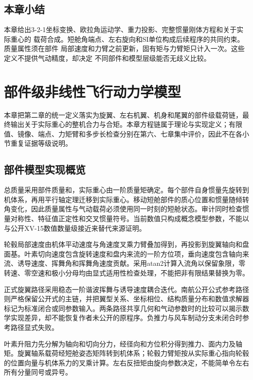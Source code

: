 \documentclass[UTF8,12pt,oneside,openany,fontset=windows]{ctexbook}
\begin{document}
\section{本章小结}

本章给出3-2-1坐标变换、欧拉角运动学、重力投影、完整惯量刚体方程和关于实际重心的 载荷合成。短舱角端点、左右旋向和SI单位构成后续程序的共同约束。质量属性须在部件 局部速度和力臂之前更新，固有矩与力臂矩只计入一次。这些定义不提供气动精度，却决定 不同部件和模型层级能否无歧义比较。

\chapter{部件级非线性飞行动力学模型}

本章把第二章的统一定义落实为旋翼、左右机翼、机身和尾翼的部件级载荷链，最终输出关于实际重心的整机合力与合矩。本章方程链属于理论与实现定义；有限值、镜像、端点、力矩臂和多步长检查分别在第六、七章集中评价，因此不在各小节重复证据等级说明。

\section{部件模型实现概览}

总质量采用部件质量和，实际重心由一阶质量矩确定。每个部件自身惯量先旋转到机体系，再用平行轴定理迁移到实际重心。移动短舱部件的质心位置和惯量随倾转角变化，因此质量属性与气动载荷必须使用同一时刻的短舱状态。审计同时检查惯量对称性、特征值正定性和交叉惯量符号。当前数值只构成概念模型参数，不能以与公开XV-15数值数量级接近来替代来源证明。

轮毂局部速度由机体平动速度与角速度叉乘力臂叠加得到，再投影到旋翼轴向和盘面基。叶素切向速度包含旋转速度和盘内来流的一阶方位项，垂向速度包含轴向来流、诱导速度、挥舞角和挥舞角速度贡献。采用atan2计算入流角以保留象限，零转速、零空速和极小分母均由显式适用性检查处理，不能把非有限结果替换为零。

正式旋翼路径采用稳态一阶谐波挥舞与诱导速度耦合迭代。南航公开公式参考路径则严格保留公开式的主链，并把翼型关系、坐标相位、结构质量分布和数值求解器标记为标准闭合或同参数输入。两条路径共享几何和气动参数时的比较可以揭示数学实现差异，却不能恢复作者未公开的原程序。负推力与风车制动分支未闭合时参考路径显式失败。

叶素升阻力先分解为轴向和切向分力，经径向和方位积分得到推力、面内力及轴矩。旋翼轴系载荷经短舱姿态矩阵转到机体系；轮毂力臂矩按从实际重心指向轮毂的位置向量与机体系力的叉乘计算。左右反扭矩由旋向参数决定，不能简单令左右所有分量同号或异号。
\end{document}

